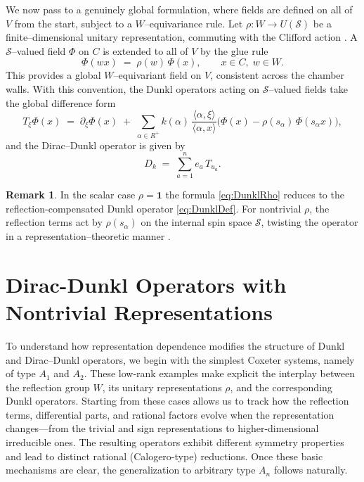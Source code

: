 \documentclass[12pt]{article}
\newcommand{\1}{\mathbbm{1}}
\theoremstyle{definition}
\newtheorem{remark}{Remark}
\begin{document}
We now pass to a genuinely global formulation, where fields are defined
on all of $V$ from the start, subject to a $W$--equivariance rule.
Let $\rho: W \to U(\mathcal{S})$ be a finite--dimensional unitary
representation, commuting with the Clifford action \cite{Lounesto2001}. A
$\mathcal{S}$--valued field $\Phi$ on $C$ is extended to all of $V$ by
the glue rule
\begin{equation}\label{eq:GlueRuleGlobal}
  \Phi(w x) \;=\; \rho(w)\,\Phi(x),
  \qquad x\in C,\; w\in W.
\end{equation}
This provides a global $W$--equivariant field on $V$, consistent across
the chamber walls. With this convention, the Dunkl operators acting on $\mathcal{S}$--valued
fields take the global difference form
\begin{equation}\label{eq:DunklRho}
  T_{\xi} \Phi(x) \;=\; \partial_{\xi}\Phi(x)
  \;+\; \sum_{\alpha\in R^{+}} k(\alpha)\,
        \frac{\langle \alpha,\xi\rangle}{\langle \alpha,x\rangle}
        \Big(\Phi(x)-\rho(s_{\alpha})\,\Phi(s_{\alpha}x)\Big),
\end{equation}
and the Dirac--Dunkl operator is given by
\begin{equation}\label{eq:DiracDunklGlobal}
  D_{k} \;=\; \sum_{a=1}^{n} e_{a}\, T_{u_{a}}.
\end{equation}

\begin{remark}
In the scalar case $\rho=\mathbf{1}$ the formula
\eqref{eq:DunklRho} reduces to the reflection-compensated Dunkl operator
\eqref{eq:DunklDef}. For nontrivial $\rho$, the reflection terms act by
$\rho(s_\alpha)$ on the internal spin space $\mathcal{S}$, twisting the
operator in a representation--theoretic manner \cite{VazRocha2016}.
\end{remark}



\section{Dirac-Dunkl Operators with Nontrivial Representations}



To understand how representation dependence modifies the structure of Dunkl and Dirac--Dunkl operators, we begin with the simplest Coxeter systems, namely of type $A_1$ and $A_2$.  These low-rank examples make explicit the interplay between the reflection group $W$, its unitary representations $\rho$, and the corresponding Dunkl operators.  Starting from these cases allows us to track how the reflection terms, differential parts, and rational factors evolve when the representation changes—from the trivial and sign representations to higher-dimensional irreducible ones.  The resulting operators exhibit different symmetry properties and lead to distinct rational (Calogero-type) reductions.  Once these basic mechanisms are clear, the generalization to arbitrary type $A_n$ follows naturally.
\end{document}
